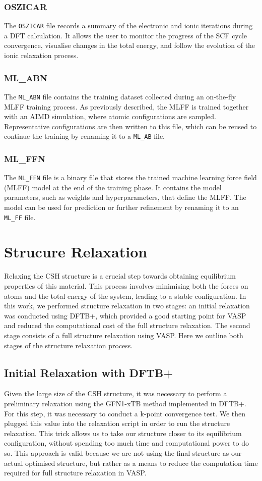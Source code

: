 \subsubsection{OSZICAR}
The \texttt{OSZICAR} file records a summary of the electronic and ionic iterations during a DFT calculation. It allows the user to monitor the progress of the SCF cycle convergence, visualise changes in the total energy, and follow the evolution of the ionic relaxation process. 
\subsubsection{ML\_ABN}
The \texttt{ML\_ABN} file contains the training dataset collected during an on-the-fly MLFF training process. As previously described, the MLFF is trained together with an AIMD simulation, where atomic configurations are sampled. Representative configurations are then written to this file, which can be reused to continue the training by renaming it to a \texttt{ML\_AB} file.

\subsubsection{ML\_FFN}
The \texttt{ML\_FFN} file is a binary file that stores the trained machine learning force field (MLFF) model at the end of the training phase. It contains the model parameters, such as weights and hyperparameters, that define the MLFF. The model can be used for prediction or further refinement by renaming it to an \texttt{ML\_FF} file.


\section{Strucure Relaxation}
Relaxing the CSH structure is a crucial step towards obtaining equilibrium properties of this material. This process involves minimising both the forces on atoms and the total energy of the system, leading to a stable configuration. In this work, we performed structure relaxation in two stages: an initial relaxation was conducted using DFTB+, which provided a good starting point for VASP and reduced the computational cost of the full structure relaxation. The second stage consists of a full structure relaxation using VASP. Here we outline both stages of the structure relaxation process.

\subsection{Initial Relaxation with DFTB+}
Given the large size of the CSH structure, it was necessary to perform a preliminary relaxation using the GFN1-xTB method implemented in DFTB+. For this step, it was necessary to conduct a k-point convergence test. We then plugged this value into the relaxation script in order to run the structure relaxation. This trick allows us to take our structure closer to its equilibrium configuration, without spending too much time and computational power to do so. This approach is valid because we are not using the final structure as our actual optimised structure, but rather as a means to reduce the computation time required for full structure relaxation in VASP.  

